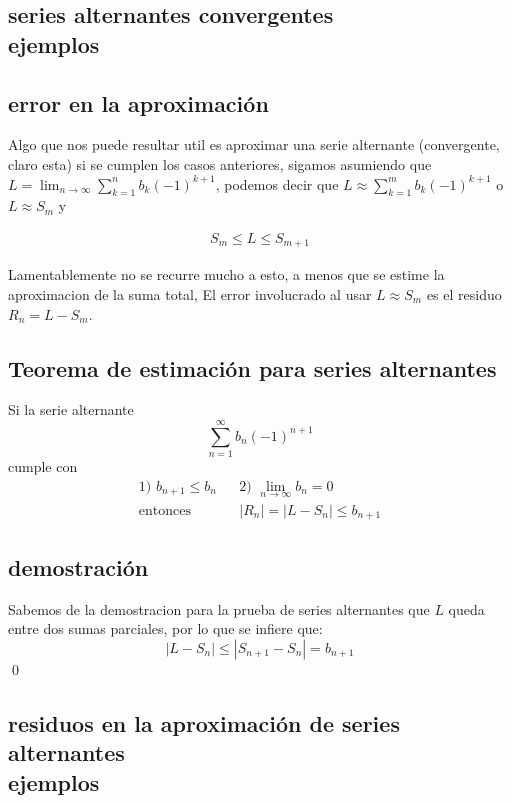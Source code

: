 \documentclass[12pt,letterpaper]{article}
\providecommand{\abs}[1]{\lvert#1\rvert} %
\begin{document}
		\subsection{series alternantes convergentes \\ \small{ejemplos}}
		
		\subsection{error en la aproximación}
			Algo que nos puede resultar util es aproximar una serie alternante (convergente, claro esta) si se cumplen 	los casos anteriores, sigamos asumiendo que $L = \displaystyle \lim_{n \rightarrow \infty} \sum_{k = 1}^{n} b_k(-1)^{k+1}$, podemos decir que $L \approx \displaystyle \sum_{k = 1}^{m} b_k (-1)^{k+1}$ o $L \approx S_m $ y 
			
				\begin{align*}		
					S_m \leq L \leq S_{m+1}	%
				\end{align*}	
		
		Lamentablemente no se recurre mucho a esto, a menos que se estime la aproximacion de la suma total, El error involucrado al usar $L \approx S_m$ es el residuo $R_n = L - S_m$.
		
		\subsection{Teorema de estimación para series alternantes}
			Si la serie alternante 
				$$ \displaystyle \sum_{n=1}^{\infty} b_n (-1)^{n+1} $$
			cumple con 
			\begin{align*}
				\mbox{1) $b_{n+1} \leq b_n$} && \mbox{2) $\displaystyle \lim_{n \rightarrow \infty} b_n = 0$} \\			
				\mbox{entonces} && \abs{R_n} = \abs{L-S_n} \leq b_{n + 1}
			\end{align*}

		\subsection{demostración}
			Sabemos de la demostracion para la prueba de series alternantes que $L$ queda entre dos sumas parciales, por lo que se infiere que:
				$$ | L - S_n | \leq |S_{n+1} - S_n| = b_{n+1}	$$
				\qed


		\subsection{residuos en la aproximación de series alternantes \\ \small{ejemplos}}
		
\end{document}
